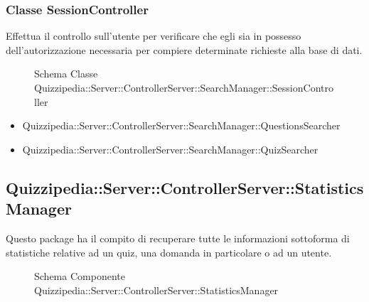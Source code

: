 \subsubsection{Classe SessionController}
Effettua il controllo sull'utente per verificare che egli sia in possesso dell'autorizzazione necessaria per compiere determinate richieste alla base di dati.
\begin{figure}[H]
\centering
\noindent{}
\caption[Schema Classe SessionController]{Schema Classe Quizzipedia::Server::ControllerServer::SearchManager::SessionController}
\end{figure}
\begin{itemize}
\item Quizzipedia::Server::ControllerServer::SearchManager::QuestionsSearcher
\item Quizzipedia::Server::ControllerServer::SearchManager::QuizSearcher
\end{itemize}
\subsection{Quizzipedia::Server::ControllerServer::StatisticsManager}
Questo package ha il compito di recuperare tutte le informazioni sottoforma di statistiche relative ad un quiz, una domanda in particolare o ad un utente.
\begin{figure}[H]
\centering
\noindent{}
\caption[Schema Componente Quizzipedia::Server::ControllerServer::StatisticsManager]{Schema Componente Quizzipedia::Server::ControllerServer::StatisticsManager}
\end{figure}
